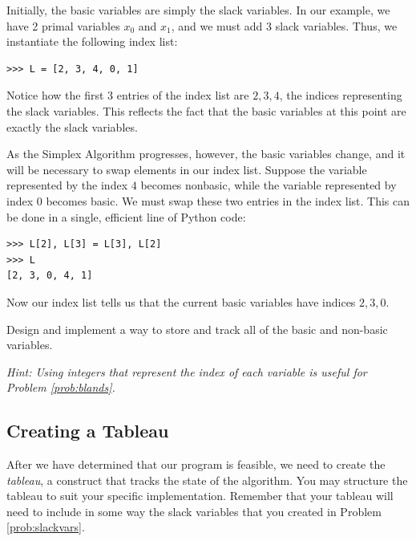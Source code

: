 Initially, the basic variables are simply the slack variables.
In our example, we have 2 primal variables $x_0$ and $x_1$, and we must add 3 slack variables.
Thus, we instantiate the following index list:
\begin{lstlisting}
>>> L = [2, 3, 4, 0, 1]
\end{lstlisting}
Notice how the first $3$ entries of the index list are $2, 3, 4$, the indices representing the slack variables.
This reflects the fact that the basic variables at this point are exactly the slack variables.

As the Simplex Algorithm progresses, however, the basic variables change, and it will be necessary to swap
elements in our index list. Suppose the variable represented by the index $4$ becomes nonbasic, while
the variable represented by index $0$ becomes basic. We must swap these two entries in the index list.
This can be done in a single, efficient line of Python code:
\begin{lstlisting}
>>> L[2], L[3] = L[3], L[2]
>>> L
[2, 3, 0, 4, 1]
\end{lstlisting}
Now our index list tells us that the current basic variables have indices $2, 3, 0$.

\begin{problem}
Design and implement a way to store and track all of the basic and non-basic variables.

\emph{Hint: Using integers that represent the index of each variable is useful for Problem \ref{prob:blands}.}
\label{prob:slackvars}
\end{problem}

\subsection{Creating a Tableau}
After we have determined that our program is feasible, we need to create the \emph{tableau}, a construct
that tracks the state of the algorithm.
You may structure the tableau to suit your specific implementation.
Remember that your tableau will need to include in some way the slack variables that you created in Problem 
\ref{prob:slackvars}.

